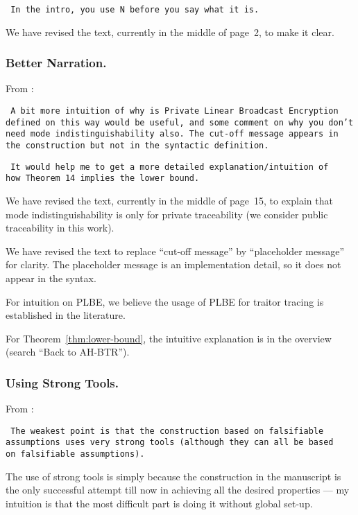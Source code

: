 \texttt{
In the intro, you use N before you say what it is.
}

We have revised the text,
currently in the middle of page~2,
to make it clear.

\subsubsection{Better Narration.}
From :

\texttt{
A bit more intuition of why is Private Linear Broadcast Encryption \\
defined on this way would be useful, and some comment on why you don't \\
need mode indistinguishability also. The cut-off message appears in \\
the construction but not in the syntactic definition.
}

\texttt{
It would help me to get a more detailed explanation/intuition of \\
how Theorem 14 implies the lower bound.
}

We have revised the text,
currently in the middle of page~15,
to explain that mode indistinguishability is only for private traceability
(we consider public traceability in this work).

We have revised the text
to replace ``cut-off message'' by ``placeholder message''
for clarity.
The placeholder message is an implementation detail,
so it does not appear in the syntax.

For intuition on PLBE,
we believe the usage of PLBE for traitor tracing
is established in the literature.

For Theorem~\ref{thm:lower-bound},
the intuitive explanation is in the overview (search ``Back to AH-BTR'').

\subsubsection{Using Strong Tools.}
From :

\texttt{
The weakest point is that the construction based on falsifiable \\
assumptions uses very strong tools (although they can all be based \\
on falsifiable assumptions).
}

The use of strong tools is simply because the construction in the manuscript
is the only successful attempt till now in achieving
all the desired properties ---
my intuition is that the most difficult part is doing it without global set-up.

